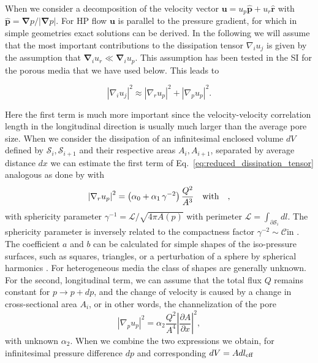 \documentclass[draft]{agujournal2019}
\begin{document}
When we consider a decomposition of the velocity vector  $\mathbf{u} = u_p \mathbf{\hat{p}} + u_r \mathbf{\hat{r}}$ with $\mathbf{\hat{p}} =\mathbf{ \nabla}p/|\mathbf{ \nabla}p|$. For HP flow $\mathbf{u}$ is parallel to the pressure gradient, for which in simple geometries exact solutions can be derived. In the following we will assume that the most important contributions to the dissipation tensor $\nabla_i u_j$ is given by the assumption that $\mathbf{\nabla}_i u_r \ll \mathbf{\nabla}_i u_p $. This assumption has been tested in the SI for the porous media that we have used below. This leads to 

\begin{equation}\label{eq:reduced_dissipation_tensor}
\left|\nabla_i u_j\right|^2 \approx  \left|\nabla_r u_p\right|^2 + \left|\nabla_p u_p\right|^2 .
\end{equation}

Here the first term is much more important since the velocity-velocity correlation length in the longitudinal direction is usually much larger than the average pore size. When we consider the dissipation of an infinitesimal enclosed volume $dV$ defined by $\mathcal{S}_i,\mathcal{S}_{i+1}$ and their respective areas $A_i, A_{i+1}$, separated by average distance $dx$ we can estimate the first term of Eq.~\ref{eq:reduced_dissipation_tensor} analogous as done by \cite{mortensen_reexamination_2005} with
\begin{equation}
	\left|\nabla_r u_p\right|^2 = \left(\alpha_0+\alpha_1\,\gamma^{-2}\right)\frac{ Q^2}{A^3}~~~ \rm{with}~~~ ,
\end{equation}
with sphericity parameter $\gamma^{-1} = \mathcal{L}/\sqrt{ 4\pi A(p)}$ with perimeter $\mathcal{L} = \int_{\partial \mathcal{S}_i}dl$. The sphericity parameter is inversely related to the compactness factor $\gamma^{-2}\sim \mathcal{C} $in \cite{mortensen_reexamination_2005}. The coefficient $a$ and $b$ can be calculated for simple shapes of the iso-pressure surfaces, such as squares, triangles, or a perturbation of a sphere by spherical harmonics . For heterogeneous media the class of shapes are generally unknown. For the second, longitudinal term, we can assume that the total flux $Q$ remains constant for $p\rightarrow p+dp$, and the change of velocity is caused by a change in cross-sectional area $A_i$, or in other words, the channelization of the pore 
\begin{equation}
	\left|\nabla_p u_p\right|^2 = \alpha_2  \frac{Q^2}{A^4}\left|\frac{\partial A}{\partial x }\right|^2,
\end{equation}
with unknown $\alpha_2$. When we combine the two expressions we obtain, for infinitesimal pressure difference $d p$ and corresponding $dV = A dl_{\rm{eff}}$
\end{document}

